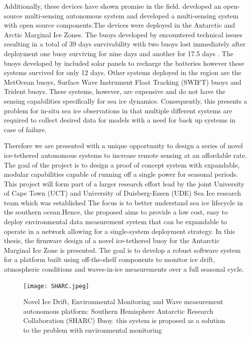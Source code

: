 Additionally, these devices have shown promise in the field.\textcite{rabault2019open} developed an open-source multi-sensing autonomous system and \textcite{kohout2015device} developed a multi-sensing system with open source components.The devices were deployed in the Antarctic and Arctic Marginal Ice Zones. The buoys developed by \textcite{kohout2015device} encountered technical issues resulting in a total of 39 days survivability with two buoys lost immediately after deployment one buoy surviving for nine days and another for 17.5 days \cite{kohout2015device}. The buoys developed by \textcite{rabault2019open}  included solar panels to recharge the batteries however these systems survived for only 12 days.  Other systems deployed in the region are the MetOcean buoys, Surface Wave Instrument Float Tracking (SWIFT) buoys and Trident buoys. These systems, however, are expensive and do not have the sensing capabilities specifically for sea ice dynamics. Consequently, this presents a problem for in-situ sea ice observations in that multiple different systems are required to collect desired data for models with a need for back up systems in case of failure. 

Therefore we are presented with a unique opportunity to design a series of novel ice-tethered autonomous systems to increase remote sensing at an affordable rate. The goal of the project is to design a proof of concept system with expandable, modular capabilities capable of running off a single power for seasonal periods. This project will form part of a larger research effort lead by the joint University of Cape Town (UCT) and University of Duisberg-Essen (UDE) Sea Ice research team which was established The focus is to better understand sea ice lifecycle in the southern ocean.Hence, the proposed aims to provide a low cost, easy to deploy environmental data measurement system that can be expandable to operate in a network allowing for a single-system deployment strategy. In this thesis, the firmware design of a novel ice-tethered buoy for the Antarctic Marginal Ice Zone is presented. The goal is to develop a robust software system  for a platform built using off-the-shelf components to monitor ice drift, atmospheric conditions and waves-in-ice measurements over a full seasonal cycle.

\begin{figure}[H]
    \centering
    \texttt{[image: SHARC.jpeg]}
    \caption{Novel Ice Drift, Environmental Monitoring and Wave measurement autonomous platform: Southern Hemisphere Antarctic Research Collaboration (SHARC) Buoy. this system is proposed as a solution to the problem with environmental monitoring}
    \label{fig:chapter1_sharc_buoy}
\end{figure}


